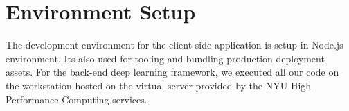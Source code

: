 \section{Environment Setup}

The development environment for the client side application is setup in Node.js environment. Its also used for tooling and bundling production deployment assets. For the back-end deep learning framework, we executed all our code on the workstation hosted on the virtual server provided by the NYU High Performance Computing services. 

